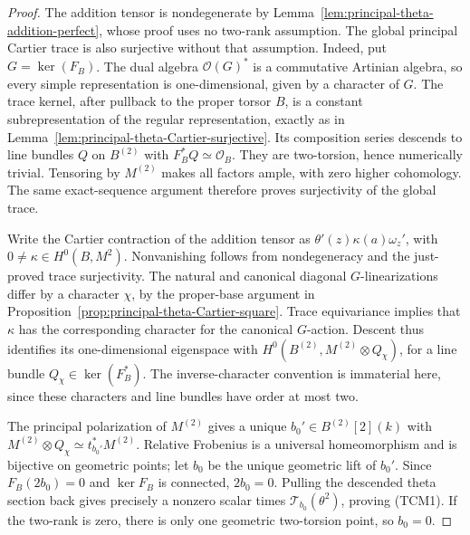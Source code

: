 \begin{proof}
The addition tensor is nondegenerate by
Lemma~\ref{lem:principal-theta-addition-perfect}, whose proof uses no
two-rank assumption.  The global principal Cartier trace is also
surjective without that assumption.  Indeed, put \(G=\ker(F_B)\).
The dual algebra \(\mathcal O(G)^*\) is a commutative Artinian
algebra, so every simple representation is one-dimensional, given
by a character of \(G\).  The trace kernel, after pullback to the
proper torsor \(B\), is a constant subrepresentation of the regular
representation, exactly as in
Lemma~\ref{lem:principal-theta-Cartier-surjective}.  Its composition
series descends to line bundles \(Q\) on \(B^{(2)}\) with
\(F_B^*Q\simeq\mathcal O_B\).  They are two-torsion, hence
numerically trivial.  Tensoring by \(M^{(2)}\) makes all factors
ample, with zero higher cohomology.  The same exact-sequence argument
therefore proves surjectivity of the global trace.

Write the Cartier contraction of the addition tensor as
\(\theta'(z)\kappa(a)\omega_z'\), with
\(0\ne\kappa\in H^0(B,M^2)\).  Nonvanishing follows from
nondegeneracy and the just-proved trace surjectivity.  The natural
and canonical diagonal \(G\)-linearizations differ by a character
\(\chi\), by the proper-base argument in
Proposition~\ref{prop:principal-theta-Cartier-square}.
Trace equivariance implies that \(\kappa\) has the corresponding
character for the canonical \(G\)-action.  Descent thus identifies
its one-dimensional eigenspace with
\(H^0(B^{(2)},M^{(2)}\otimes Q_\chi)\), for a line bundle
\(Q_\chi\in\ker(F_B^*)\).  The inverse-character convention is
immaterial here, since these characters and line bundles have order
at most two.

The principal polarization of \(M^{(2)}\) gives a unique
\(b_0'\in B^{(2)}[2](k)\) with
\(M^{(2)}\otimes Q_\chi\simeq t_{b_0'}^*M^{(2)}\).
Relative Frobenius is a universal homeomorphism and is bijective
on geometric points; let \(b_0\) be the unique geometric lift of
\(b_0'\).  Since \(F_B(2b_0)=0\) and \(\ker F_B\) is connected,
\(2b_0=0\).  Pulling the descended theta section back gives precisely
a nonzero scalar times \(\mathcal T_{b_0}(\theta^2)\), proving
(TCM1).  If the two-rank is zero, there is only one geometric
two-torsion point, so \(b_0=0\).
\end{proof}

